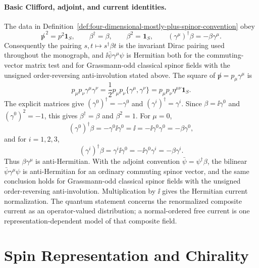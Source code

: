 \paragraph{Basic Clifford, adjoint, and current identities.}
The data in Definition~\ref{def:four-dimensional-mostly-plus-spinor-convention}
obey
\[
  \not p^{\,2}=p^2\mathbf 1_S,
  \qquad
  \beta^\dagger=\beta,
  \qquad
  \beta^2=\mathbf 1_S,
  \qquad
  (\gamma^\mu)^\dagger\beta=-\beta\gamma^\mu .
\]
Consequently the pairing \(s,t\mapsto s^\dagger\beta t\) is the invariant
Dirac pairing used throughout the monograph, and
\(\ii\bar\psi\gamma^\mu\psi\) is Hermitian both for the commuting-vector
matrix test and for Grassmann-odd classical spinor fields with the unsigned
order-reversing anti-involution stated above.
The square of \(\not p=p_\mu\gamma^\mu\) is
\[
  p_\mu p_\nu\gamma^\mu\gamma^\nu
  =
  \frac12 p_\mu p_\nu\{\gamma^\mu,\gamma^\nu\}
  =
  p_\mu p_\nu\eta^{\mu\nu}\mathbf 1_S.
\]
The explicit matrices give
\((\gamma^0)^\dagger=-\gamma^0\) and
\((\gamma^i)^\dagger=\gamma^i\).  Since \(\beta=\ii\gamma^0\) and
\((\gamma^0)^2=-1\), this gives \(\beta^\dagger=\beta\) and
\(\beta^2=1\).  For \(\mu=0\),
\[
  (\gamma^0)^\dagger\beta=-\gamma^0\ii\gamma^0=\ii
  =
  -\ii\gamma^0\gamma^0=-\beta\gamma^0 ,
\]
and for \(i=1,2,3\),
\[
  (\gamma^i)^\dagger\beta
  =
  \gamma^i\ii\gamma^0
  =
  -\ii\gamma^0\gamma^i
  =
  -\beta\gamma^i .
\]
Thus \(\beta\gamma^\mu\) is anti-Hermitian.  With the adjoint convention
\(\bar\psi=\psi^\dagger\beta\), the bilinear
\(\bar\psi\gamma^\mu\psi\) is anti-Hermitian for an ordinary commuting
spinor vector, and the same conclusion holds for Grassmann-odd classical
spinor fields with the unsigned order-reversing anti-involution.  Multiplication
by \(\ii\) gives the Hermitian current normalization.  The quantum statement
concerns the renormalized composite current as an operator-valued distribution;
a normal-ordered free current is one representation-dependent model of that
composite field.

\section{Spin Representation and Chirality}

